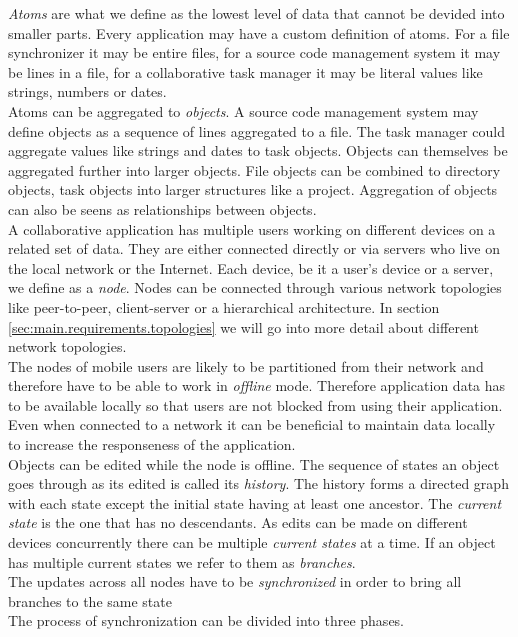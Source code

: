 \emph{Atoms} are what we define as the lowest level of data that cannot be devided into smaller parts.
Every application may have a custom definition of atoms.
For a file synchronizer it may be entire files, for a source code management system it may be lines in a file, for a collaborative task manager it may be literal values like strings, numbers or dates.\\
Atoms can be aggregated to \emph{objects}.
A source code management system may define objects as a sequence of lines aggregated to a file.
The task manager could aggregate values like strings and dates to task objects.
Objects can themselves be aggregated further into larger objects.
File objects can be combined to directory objects, task objects into larger structures like a project.
Aggregation of objects can also be seens as relationships between objects.\\
A collaborative application has multiple users working on different devices on a related set of data.
They are either connected directly or via servers who live on the local network or the Internet.
Each device, be it a user's device or a server, we define as a \emph{node}.
Nodes can be connected through various network topologies like peer-to-peer, client-server or a hierarchical architecture.
In section \ref{sec:main.requirements.topologies} we will go into more detail about different network topologies.\\
The nodes of mobile users are likely to be partitioned from their network and therefore have to be able to work in \emph{offline} mode.
Therefore application data has to be available locally so that users are not blocked from using their application.
Even when connected to a network it can be beneficial to maintain data locally to increase the responseness of the application.\\
Objects can be edited while the node is offline.
The sequence of states an object goes through as its edited is called its \emph{history}.
The history forms a directed graph with each state except the initial state having at least one ancestor.
The \emph{current state} is the one that has no descendants.
As edits can be made on different devices concurrently there can be multiple \emph{current states} at a time.
If an object has multiple current states we refer to them as \emph{branches}.\\
The updates across all nodes have to be \emph{synchronized} in order to bring all branches to the same state\\
The process of synchronization can be divided into three phases.
